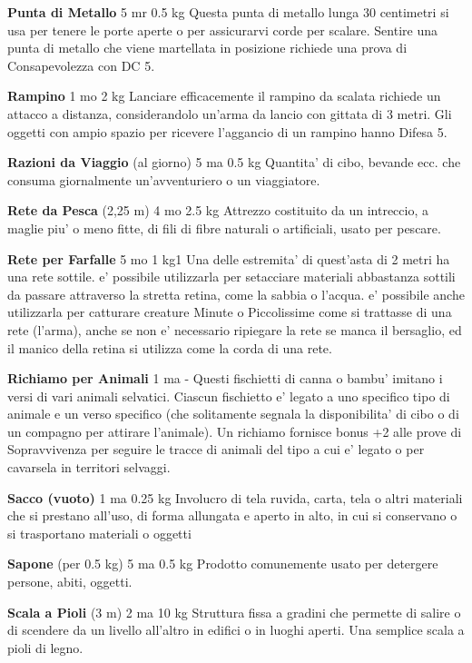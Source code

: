 \documentclass[a4paper,11pt,twoside,openany]{book}
\begin{document}
{\textbf{Punta di Metallo} 5 mr 0.5 kg Questa punta di metallo lunga 30 centimetri si usa per tenere le porte aperte o per assicurarvi corde per scalare. Sentire una punta di metallo che viene martellata in posizione richiede una prova di Consapevolezza con DC 5.

\textbf{Rampino} 1 mo 2 kg Lanciare efficacemente il rampino da scalata richiede un attacco a distanza, considerandolo un'arma da lancio con gittata di 3 metri. Gli oggetti con ampio spazio per ricevere l'aggancio di un rampino hanno Difesa 5.

\textbf{Razioni da Viaggio} (al giorno) 5 ma 0.5 kg Quantita' di cibo, bevande ecc. che consuma giornalmente un'avventuriero o un viaggiatore.

\textbf{Rete da Pesca} (2,25 m) 4 mo 2.5 kg Attrezzo costituito da un intreccio, a maglie piu' o meno fitte, di fili di fibre naturali o artificiali, usato per pescare.

\textbf{Rete per Farfalle} 5 mo 1 kg1 Una delle estremita' di quest'asta di 2 metri ha una rete sottile. e' possibile utilizzarla per setacciare materiali abbastanza sottili da passare attraverso la stretta retina, come la sabbia o l'acqua. e' possibile anche utilizzarla per catturare creature Minute o Piccolissime come si trattasse di una rete (l'arma), anche se non e' necessario ripiegare la rete se manca il bersaglio, ed il manico della retina si utilizza come la corda di una rete.

\textbf{Richiamo per Animali} 1 ma - Questi fischietti di canna o bambu' imitano i versi di vari animali selvatici. Ciascun fischietto e' legato a uno specifico tipo di animale e un verso specifico (che solitamente segnala la disponibilita' di cibo o di un compagno per attirare l'animale). Un richiamo fornisce bonus +2 alle prove di Sopravvivenza per seguire le tracce di animali del tipo a cui e' legato o per cavarsela in territori selvaggi.

\textbf{Sacco (vuoto)} 1 ma 0.25 kg Involucro di tela ruvida, carta, tela o altri materiali che si prestano all'uso, di forma allungata e aperto in alto, in cui si conservano o si trasportano materiali o oggetti

\textbf{Sapone} (per 0.5 kg) 5 ma 0.5 kg Prodotto comunemente usato per detergere persone, abiti, oggetti.

\textbf{Scala a Pioli} (3 m) 2 ma 10 kg Struttura fissa a gradini che permette di salire o di scendere da un livello all'altro in edifici o in luoghi aperti. Una semplice scala a pioli di legno.

}
\end{document}
